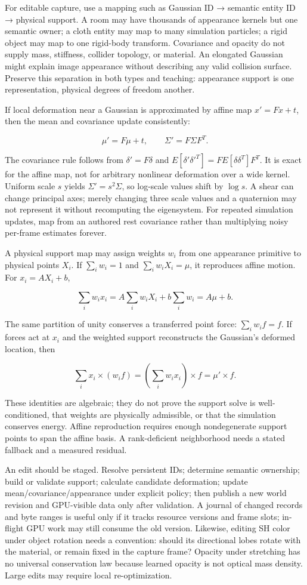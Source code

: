 For editable capture, use a mapping such as Gaussian ID → semantic entity ID → physical support. A room may have thousands of appearance kernels but one semantic owner; a cloth entity may map to many simulation particles; a rigid object may map to one rigid-body transform. Covariance and opacity do not supply mass, stiffness, collider topology, or material. An elongated Gaussian might explain image appearance without describing any valid collision surface. Preserve this separation in both types and teaching: appearance support is one representation, physical degrees of freedom another.

If local deformation near a Gaussian is approximated by affine map \(x'=Fx+t\), then the mean and covariance update consistently:

\[
\mu'=F\mu+t,\qquad \Sigma'=F\Sigma F^T.
\]

The covariance rule follows from \(\delta'=F\delta\) and \(E[\delta'\delta'^T]=FE[\delta\delta^T]F^T\). It is exact for the affine map, not for arbitrary nonlinear deformation over a wide kernel. Uniform scale \(s\) yields \(\Sigma'=s^2\Sigma\), so log-scale values shift by \(\log s\). A shear can change principal axes; merely changing three scale values and a quaternion may not represent it without recomputing the eigensystem. For repeated simulation updates, map from an authored rest covariance rather than multiplying noisy per-frame estimates forever.

A physical support map may assign weights \(w_i\) from one appearance primitive to physical points \(X_i\). If \(\sum_iw_i=1\) and \(\sum_iw_iX_i=\mu\), it reproduces affine motion. For \(x_i=AX_i+b\),

\[
\sum_iw_ix_i=A\sum_iw_iX_i+b\sum_iw_i=A\mu+b.
\]

The same partition of unity conserves a transferred point force: \(\sum_iw_if=f\). If forces act at \(x_i\) and the weighted support reconstructs the Gaussian's deformed location, then

\[
\sum_ix_i\times(w_if)=\left(\sum_iw_ix_i\right)\times f=\mu'\times f.
\]

These identities are algebraic; they do not prove the support solve is well-conditioned, that weights are physically admissible, or that the simulation conserves energy. Affine reproduction requires enough nondegenerate support points to span the affine basis. A rank-deficient neighborhood needs a stated fallback and a measured residual.

An edit should be staged. Resolve persistent IDs; determine semantic ownership; build or validate support; calculate candidate deformation; update mean/covariance/appearance under explicit policy; then publish a new world revision and GPU-visible data only after validation. A journal of changed records and byte ranges is useful only if it tracks resource versions and frame slots; in-flight GPU work may still consume the old version. Likewise, editing SH color under object rotation needs a convention: should its directional lobes rotate with the material, or remain fixed in the capture frame? Opacity under stretching has no universal conservation law because learned opacity is not optical mass density. Large edits may require local re-optimization.

